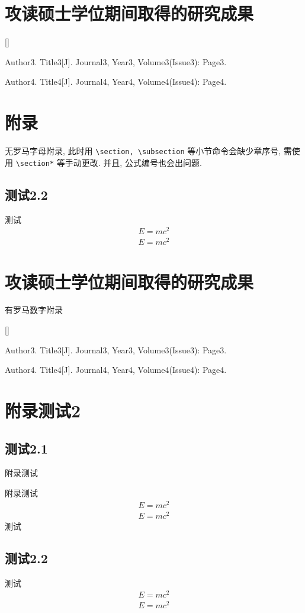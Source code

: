 \chapter*{攻读硕士学位期间取得的研究成果}
\begin{list}{[]}{}
    \item Author3. Title3[J]. Journal3, Year3, Volume3(Issue3): Page3.
    \item Author4. Title4[J]. Journal4, Year4, Volume4(Issue4): Page4.
\end{list}

\chapter*{附录}
无罗马字母附录, 此时用 \verb|\section, \subsection| 等小节命令会缺少章序号, 需使用 \verb|\section*| 等手动更改.
并且, 公式编号也会出问题.
\section*{测试2.2}
测试
\begin{gather}
E = mc^2\\
E = mc^2
\end{gather}

\chapter{攻读硕士学位期间取得的研究成果}
有罗马数字附录
\begin{list}{[]}{}
    \item Author3. Title3[J]. Journal3, Year3, Volume3(Issue3): Page3.
    \item Author4. Title4[J]. Journal4, Year4, Volume4(Issue4): Page4.
\end{list}

\chapter{附录测试2}
\section{测试2.1}
附录测试

附录测试
\begin{gather}
E = mc^2\\
E = mc^2
\end{gather}
测试
\section{测试2.2}
测试
\begin{align*}
E = mc^2\\
E = mc^2
\end{align*}